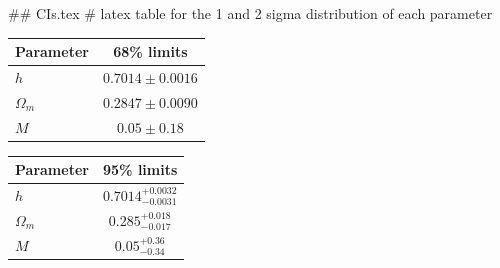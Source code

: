 ## CIs.tex
# latex table for the 1 and 2 sigma distribution of each parameter

\begin{tabular} { l  c}
 Parameter &  68\% limits\\
\hline
{\boldmath$h              $} & $0.7014\pm 0.0016          $\\
{\boldmath$\Omega_m       $} & $0.2847\pm 0.0090          $\\
{\boldmath$M              $} & $0.05\pm 0.18              $\\
\hline
\end{tabular}

\begin{tabular} { l  c}
 Parameter &  95\% limits\\
\hline
{\boldmath$h              $} & $0.7014^{+0.0032}_{-0.0031}$\\
{\boldmath$\Omega_m       $} & $0.285^{+0.018}_{-0.017}   $\\
{\boldmath$M              $} & $0.05^{+0.36}_{-0.34}      $\\
\hline
\end{tabular}
